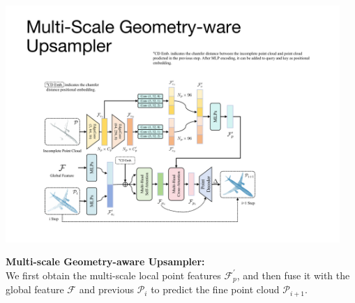 \documentclass[landscape,a0paper,fontscale=0.292]{baposter}
\begin{document}
\begin{poster}
{\begin{minipage}[c]{0.32\textwidth}
\begin{center}
        \end{center}
    \end{minipage}
    \begin{minipage}[c]{0.68\textwidth}
        \begin{center}
            \includegraphics[width=0.95\textwidth]{images/model-upsampler.pdf}
        \end{center}
    \end{minipage}
    \textbf{\color{ctitle}Multi-scale Geometry-aware Upsampler:}  \\
    We first obtain the multi-scale local point features $\mathcal{F}_p^{\prime}$, and then fuse it with the global feature $\mathcal{F}$ and previous $\mathcal{P}_i$ to predict the fine point cloud $\mathcal{P}_{i+1}$. \\
}
%
\end{poster}
\end{document}
